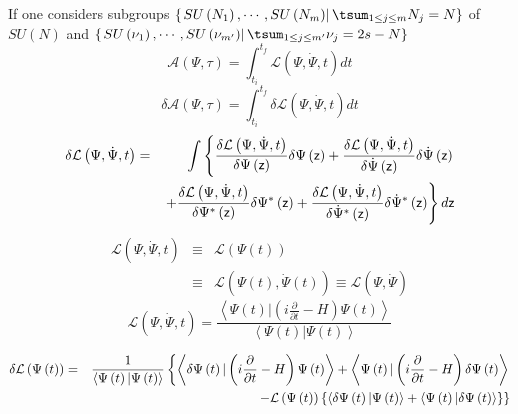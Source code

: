 \documentclass[aps,preprint]{revtex4}
\begin{document}
If one considers subgroups $\left\{ \left. SU\left( N_{1}\right) ,\cdots
,SU\left( N_{m}\right) \right\vert \tsum_{1\leq j\leq m}N_{j}=N\right\} $ of 
$SU\left( N\right) $ and $\left\{ \left. SU\left( \nu _{1}\right) ,\cdots
,SU\left( \nu _{m^{\prime }}\right) \right\vert \tsum_{1\leq j\leq m^{\prime
}}\nu _{j}=2s-N\right\} $%
\begin{equation}
\mathcal{A}\left( \Psi ,\tau \right) =\int_{t_{i}}^{t_{f}}\mathcal{L}\left(
\Psi ,\dot{\Psi},t\right) dt
\end{equation}%
\begin{equation}
\delta \mathcal{A}\left( \Psi ,\tau \right) =\int_{t_{i}}^{t_{f}}\delta 
\mathcal{L}\left( \Psi ,\dot{\Psi},t\right) dt
\end{equation}%
\begin{eqnarray}
\delta \mathcal{L}\left( \Psi ,\dot{\Psi},t\right) &=&\int \left\{ \frac{%
\delta \mathcal{L}\left( \Psi ,\dot{\Psi},t\right) }{\delta \Psi \left( 
\mathsf{z}\right) }\delta \Psi \left( \mathsf{z}\right) +\frac{\delta 
\mathcal{L}\left( \Psi ,\dot{\Psi},t\right) }{\delta \dot{\Psi}\left( 
\mathsf{z}\right) }\delta \dot{\Psi}\left( \mathsf{z}\right) \right. \\
&&\left. +\frac{\delta \mathcal{L}\left( \Psi ,\dot{\Psi},t\right) }{\delta
\Psi ^{\ast }\left( \mathsf{z}\right) }\delta \Psi ^{\ast }\left( \mathsf{z}%
\right) +\frac{\delta \mathcal{L}\left( \Psi ,\dot{\Psi},t\right) }{\delta 
\dot{\Psi}^{\ast }\left( \mathsf{z}\right) }\delta \dot{\Psi}^{\ast }\left( 
\mathsf{z}\right) \right\} d\mathsf{z}
\end{eqnarray}%
\begin{eqnarray}
\mathcal{L}\left( \Psi ,\dot{\Psi},t\right) &\equiv &\mathcal{L}\left( \Psi
\left( t\right) \right) \\
&\equiv &\mathcal{L}\left( \Psi \left( t\right) ,\dot{\Psi}\left( t\right)
\right) \equiv \mathcal{L}\left( \Psi ,\dot{\Psi}\right)
\end{eqnarray}%
\begin{equation}
\mathcal{L}\left( \Psi ,\dot{\Psi},t\right) =\frac{\left\langle \Psi \left(
t\right) |\left( i\frac{\partial }{\partial t}-H\right) \Psi \left( t\right)
\right\rangle }{\left\langle \Psi \left( t\right) |\Psi \left( t\right)
\right\rangle }
\end{equation}

\begin{eqnarray}
\delta \mathcal{L}\left( \Psi \left( t\right) \right) &=&\frac{1}{%
\left\langle \Psi \left( t\right) |\Psi \left( t\right) \right\rangle }%
\left\{ \left\langle \delta \Psi \left( t\right) |\left( i\frac{\partial }{%
\partial t}-H\right) \Psi \left( t\right) \right\rangle +\left\langle \Psi
\left( t\right) |\left( i\frac{\partial }{\partial t}-H\right) \delta \Psi
\left( t\right) \right\rangle \right.  \notag \\
&&\qquad \qquad \qquad \qquad \qquad \qquad \left. -\mathcal{L}\left( \Psi
\left( t\right) \right) \left\{ \left\langle \delta \Psi \left( t\right)
|\Psi \left( t\right) \right\rangle +\left\langle \Psi \left( t\right)
|\delta \Psi \left( t\right) \right\rangle \right\} \right\}
\end{eqnarray}
\end{document}
